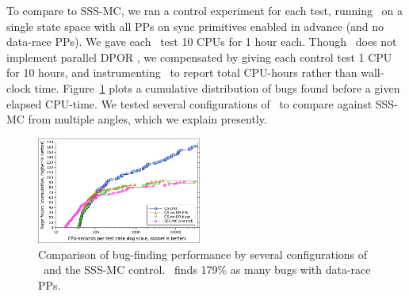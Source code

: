 To compare to SSS-MC, we ran a control experiment for each test, running \landslide~on a single state space with all PPs on sync primitives enabled in advance (and no data-race PPs).
We gave each \quicksand~test 10 CPUs for 1 hour each. %
Though \landslide~does not implement parallel DPOR \cite{parallel-dpor}, we compensated by giving each control test 1 CPU for 10 hours,
and instrumenting \quicksand~to report total CPU-hours rather than wall-clock time.
Figure~\ref{fig:dowefindbugsfaster} plots a cumulative distribution of bugs found before a given elapsed CPU-time. %
We tested several configurations of \quicksand~to compare against SSS-MC from multiple angles,
which we explain presently.

\begin{figure}[t]
	\includegraphics[width=0.48\textwidth]{dowefindbugsfaster-squashed.pdf}
	\caption{Comparison of bug-finding performance
	by several configurations of \quicksand~and the SSS-MC control.
	\quicksand~finds 179\% as many bugs with data-race PPs.}
	\label{fig:dowefindbugsfaster}
\end{figure}

